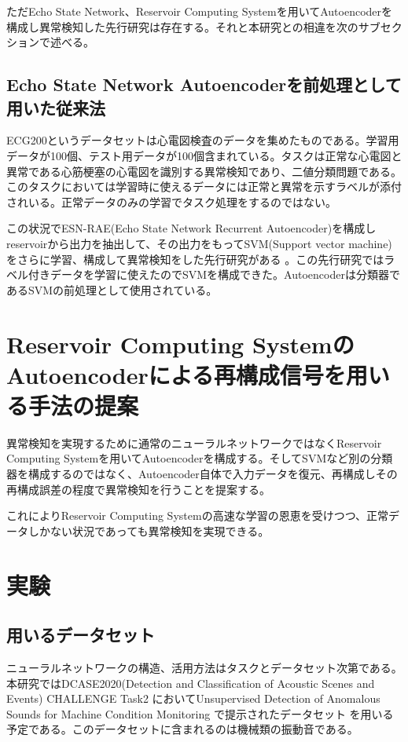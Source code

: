 \documentclass[uplatex,a4paper,10pt]{jsarticle}
\begin{document}
ただEcho State Network、Reservoir Computing Systemを用いてAutoencoderを構成し異常検知した先行研究は存在する。それと本研究との相違を次のサブセクションで述べる。

\subsection{Echo State Network Autoencoderを前処理として用いた従来法}
ECG200というデータセットは心電図検査のデータを集めたものである\cite{ecg200}。学習用データが100個、テスト用データが100個含まれている。タスクは正常な心電図と異常である心筋梗塞の心電図を識別する異常検知であり、二値分類問題である。このタスクにおいては学習時に使えるデータには正常と異常を示すラベルが添付されいる。正常データのみの学習でタスク処理をするのではない。

この状況でESN-RAE(Echo State Network Recurrent Autoencoder)を構成しreservoirから出力を抽出して、その出力をもってSVM(Support vector machine)をさらに学習、構成して異常検知をした先行研究がある\cite{esn_ae} \cite{esn_ae_simple}。この先行研究ではラベル付きデータを学習に使えたのでSVMを構成できた。Autoencoderは分類器であるSVMの前処理として使用されている。

\section{Reservoir Computing SystemのAutoencoderによる再構成信号を用いる手法の提案}
異常検知を実現するために通常のニューラルネットワークではなくReservoir Computing Systemを用いてAutoencoderを構成する。そしてSVMなど別の分類器を構成するのではなく、Autoencoder自体で入力データを復元、再構成しその再構成誤差の程度で異常検知を行うことを提案する。

これによりReservoir Computing Systemの高速な学習の恩恵を受けつつ、正常データしかない状況であっても異常検知を実現できる。

\section{実験}
\subsection{用いるデータセット}
ニューラルネットワークの構造、活用方法はタスクとデータセット次第である。本研究ではDCASE2020(Detection and Classification of
Acoustic Scenes and Events) CHALLENGE Task2 においてUnsupervised Detection of Anomalous Sounds for Machine Condition Monitoring \cite{dcase2020}で提示されたデータセット\cite{dataset_toy} \cite{dataset_machine}を用いる予定である。このデータセットに含まれるのは機械類の振動音である。
\end{document}
